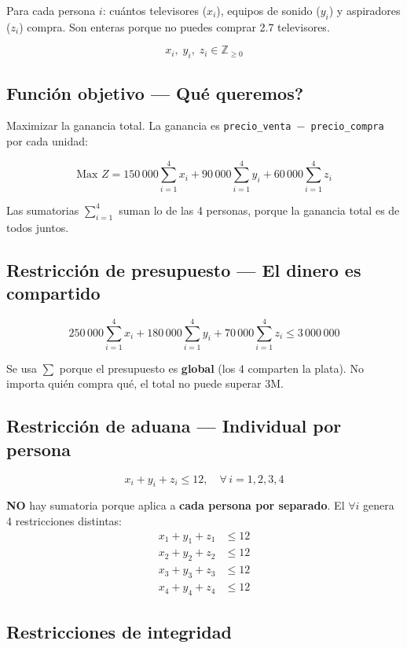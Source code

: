 \documentclass[12pt]{article}
\begin{document}
Para cada persona $i$: cu\'antos televisores ($x_i$), equipos de sonido ($y_i$) y aspiradores ($z_i$) compra. Son enteras porque no puedes comprar 2.7 televisores.

\[
    x_i,\; y_i,\; z_i \in \mathbb{Z}_{\geq 0}
\]

\subsection{Funci\'on objetivo --- \textquestiondown Qu\'e queremos?}

Maximizar la ganancia total. La ganancia es \texttt{precio\_venta $-$ precio\_compra} por cada unidad:

\[
    \text{Max } Z = 150\,000\sum_{i=1}^{4}x_i + 90\,000\sum_{i=1}^{4}y_i + 60\,000\sum_{i=1}^{4}z_i
\]

Las sumatorias $\sum_{i=1}^{4}$ suman lo de las 4 personas, porque la ganancia total es de todos juntos.

\subsection{Restricci\'on de presupuesto --- El dinero es compartido}

\[
    250\,000\sum_{i=1}^{4}x_i + 180\,000\sum_{i=1}^{4}y_i + 70\,000\sum_{i=1}^{4}z_i \leq 3\,000\,000
\]

Se usa $\sum$ porque el presupuesto es \textbf{global} (los 4 comparten la plata). No importa qui\'en compra qu\'e, el total no puede superar 3M.

\subsection{Restricci\'on de aduana --- Individual por persona}

\[
    x_i + y_i + z_i \leq 12, \quad \forall\, i = 1, 2, 3, 4
\]

\textbf{NO} hay sumatoria porque aplica a \textbf{cada persona por separado}. El $\forall i$ genera 4 restricciones distintas:
\begin{align*}
    x_1 + y_1 + z_1 &\leq 12 \\
    x_2 + y_2 + z_2 &\leq 12 \\
    x_3 + y_3 + z_3 &\leq 12 \\
    x_4 + y_4 + z_4 &\leq 12
\end{align*}

\subsection{Restricciones de integridad}
\end{document}
